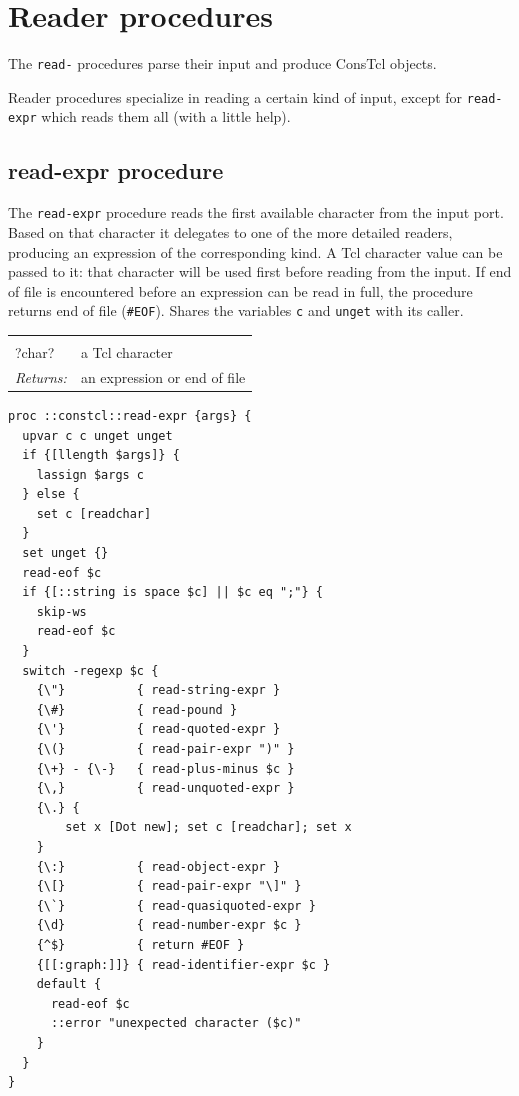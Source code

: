 \documentclass[twoside]{report}
\begin{document}
\section{Reader procedures}
\label{reader-procedures}

The \texttt{read-} procedures parse their input and produce ConsTcl objects.

Reader procedures specialize in reading a certain kind of input, except for \texttt{read-expr} which reads them all (with a little help).

\subsection{read-expr procedure}
\label{readexpr-procedure}

The \texttt{read-expr} procedure reads the first available character from the input port. Based on that character it delegates to one of the more detailed readers, producing an expression of the corresponding kind. A Tcl character value can be passed to it: that character will be used first before reading from the input. If end of file is encountered before an expression can be read in full, the procedure returns end of file (\texttt{\#EOF}). Shares the variables \texttt{c} and \texttt{unget} with its caller.

\noindent\begin{tabular}{ |p{1.9cm} p{8cm}| }
\hline
\rowcolor[HTML]{CCCCCC} \multicolumn{2}{|l|}{\bf read-expr (internal)} \\
?char? & a Tcl character \\
\textit{Returns:} & an expression or end of file \\
\hline
\end{tabular}

\begin{lstlisting}
proc ::constcl::read-expr {args} {
  upvar c c unget unget
  if {[llength $args]} {
    lassign $args c
  } else {
    set c [readchar]
  }
  set unget {}
  read-eof $c
  if {[::string is space $c] || $c eq ";"} {
    skip-ws
    read-eof $c
  }
  switch -regexp $c {
    {\"}          { read-string-expr }
    {\#}          { read-pound }
    {\'}          { read-quoted-expr }
    {\(}          { read-pair-expr ")" }
    {\+} - {\-}   { read-plus-minus $c }
    {\,}          { read-unquoted-expr }
    {\.} {
        set x [Dot new]; set c [readchar]; set x
    }
    {\:}          { read-object-expr }
    {\[}          { read-pair-expr "\]" }
    {\`}          { read-quasiquoted-expr }
    {\d}          { read-number-expr $c }
    {^$}          { return #EOF }
    {[[:graph:]]} { read-identifier-expr $c }
    default {
      read-eof $c
      ::error "unexpected character ($c)"
    }
  }
}
\end{lstlisting}
\end{document}
